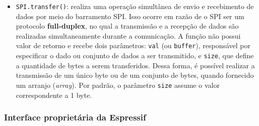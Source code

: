 \documentclass[a4paper,oneside,10pt]{article}
\begin{document}
\begin{itemize}
	\item \texttt{SPI.transfer()}: realiza uma operação simultânea de envio e recebimento de dados por meio do barramento SPI. Isso ocorre em razão de o SPI ser um protocolo \textbf{full-duplex}, no qual a transmissão e a recepção de dados são realizadas simultaneamente durante a comunicação.
	A função não possui valor de retorno e recebe dois parâmetros: \texttt{val} (ou \texttt{buffer}), responsável por especificar o dado ou conjunto de dados a ser transmitido, e \texttt{size}, que define a quantidade de bytes a serem transferidos. Dessa forma, é possível realizar a transmissão de um único byte ou de um conjunto de bytes, quando fornecido um arranjo (\textit{array}). Por padrão, o parâmetro \texttt{size} assume o valor correspondente a 1 byte.
\end{itemize}
\subsubsection{Interface proprietária da Espressif}
\end{document}
